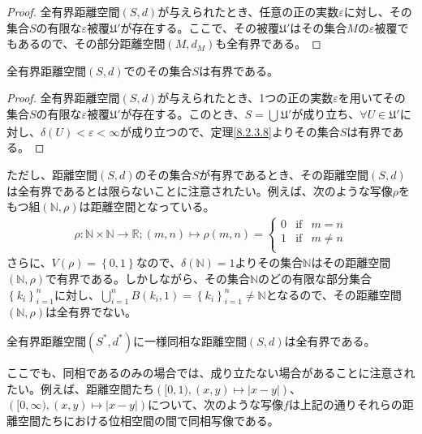 \documentclass[dvipdfmx]{jsarticle}
\begin{document}
\begin{proof}
全有界距離空間$(S,d)$が与えられたとき、任意の正の実数$\varepsilon$に対し、その集合$S$の有限な$\varepsilon$被覆$\mathfrak{U}'$が存在する。ここで、その被覆$\mathfrak{U}'$はその集合$M$の$\varepsilon$被覆でもあるので、その部分距離空間$\left( M,d_{M} \right)$も全有界である。
\end{proof}
\begin{thm}\label{8.2.4.14} 全有界距離空間$(S,d)$でのその集合$S$は有界である。
\end{thm}
\begin{proof}
全有界距離空間$(S,d)$が与えられたとき、1つの正の実数$\varepsilon$を用いてその集合$S$の有限な$\varepsilon$被覆$\mathfrak{U}'$が存在する。このとき、$S = \bigcup_{} \mathfrak{U}'$が成り立ち、$\forall U \in \mathfrak{U}'$に対し、$\delta(U) < \varepsilon < \infty$が成り立つので、定理\ref{8.2.3.8}よりその集合$S$は有界である。
\end{proof}\par
ただし、距離空間$(S,d)$のその集合$S$が有界であるとき、その距離空間$(S,d)$は全有界であるとは限らないことに注意されたい。例えば、次のような写像$\rho $をもつ組$\left( \mathbb{N} ,\rho \right)$は距離空間となっている。
\begin{align*}
\rho : \mathbb{N}\times \mathbb{N} \rightarrow \mathbb{R} ; \left(m,n\right) \mapsto \rho \left(m,n\right) = \left\{ \begin{matrix}
0 & \mathrm{if} & m = n \\
1 & \mathrm{if} & m \ne n \\
\end{matrix} \right.
\end{align*}
さらに、$V\left(\rho \right)=\left\{0,1 \right\}$なので、$\delta(\mathbb{N} ) = 1$よりその集合$\mathbb{N}$はその距離空間$\left( \mathbb{N} ,\rho \right)$で有界である。しかしながら、その集合$\mathbb{N}$のどの有限な部分集合$\left\{ k_i \right\}_{i = 1}^{n} $に対し、$\bigcup_{i = 1}^{n} B(k_i,1) = \left\{k_i \right\}_{i = 1}^{n} \ne \mathbb{N}$となるので、その距離空間$\left( \mathbb{N} ,\rho \right)$は全有界でない。
\begin{thm}\label{8.2.4.15}
全有界距離空間$\left( S^{*},d^{*} \right)$に一様同相な距離空間$(S,d)$は全有界である。
\end{thm}\par
ここでも、同相であるのみの場合では、成り立たない場合があることに注意されたい。例えば、距離空間たち$\left([0,1),\left( x,y\right) \mapsto \left| x - y \right| \right)$、$\left([0,\infty ),\left( x,y\right) \mapsto \left| x - y \right| \right)$について、次のような写像$f$は上記の通りそれらの距離空間たちにおける位相空間の間で同相写像である。
\end{document}
